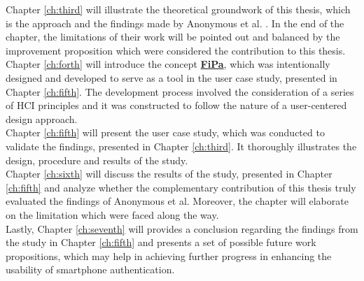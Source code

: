 Chapter \ref{ch:third} will illustrate the theoretical groundwork of this thesis, which is the approach and the findings made by Anonymous et al. \cite{anonymous}. In the end of the chapter, the limitations of their work will be pointed out and balanced by the improvement proposition which were considered the contribution to this thesis.\\

Chapter \ref{ch:forth} will introduce the concept \underline{\textbf{FiPa}}, which was intentionally designed and developed to serve as a tool in the user case study, presented in Chapter \ref{ch:fifth}. The development process involved the consideration of a series of HCI principles and it was constructed to follow the nature of a user-centered design approach. \\

Chapter \ref{ch:fifth} will present the user case study, which was conducted to validate the findings, presented in Chapter \ref{ch:third}.
It thoroughly illustrates the design, procedure and results of the study.\\

Chapter \ref{ch:sixth} will discuss the results of the study, presented in Chapter \ref{ch:fifth} and analyze whether the complementary contribution of this thesis truly evaluated the findings of Anonymous et al. \cite{anonymous} Moreover, the chapter will elaborate on the limitation which were faced along the way. \\
 
Lastly, Chapter \ref{ch:seventh} will provides a conclusion regarding the findings from the study in Chapter \ref{ch:fifth} and presents a set of possible future work propositions, which may help in achieving further progress in enhancing the usability of smartphone authentication.






